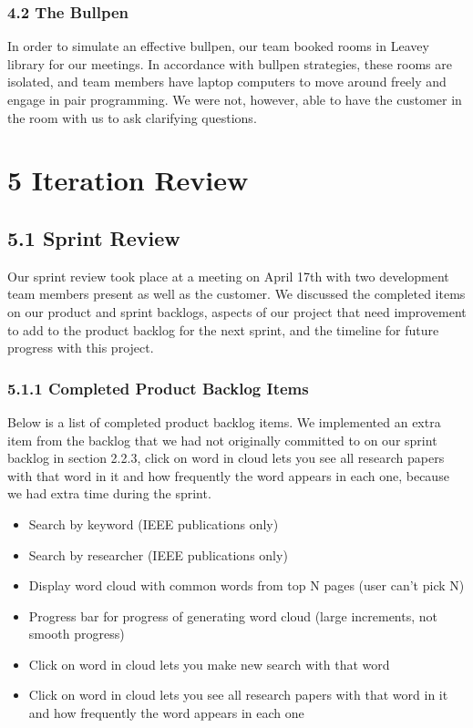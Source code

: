 \documentclass[]{article}
\begin{document}
\subsubsection{4.2 The Bullpen}\label{the-bullpen}

In order to simulate an effective bullpen, our team booked rooms in
Leavey library for our meetings. In accordance with bullpen strategies,
these rooms are isolated, and team members have laptop computers to move
around freely and engage in pair programming. We were not, however, able
to have the customer in the room with us to ask clarifying questions.

\section{5 Iteration Review}\label{iteration-review}

\subsection{5.1 Sprint Review}\label{sprint-review}

Our sprint review took place at a meeting on April 17th with two
development team members present as well as the customer. We discussed
the completed items on our product and sprint backlogs, aspects of our
project that need improvement to add to the product backlog for the next
sprint, and the timeline for future progress with this project.

\subsubsection{5.1.1 Completed Product Backlog
Items}\label{completed-product-backlog-items}

Below is a list of completed product backlog items. We implemented an
extra item from the backlog that we had not originally committed to on
our sprint backlog in section 2.2.3, click on word in cloud lets you see
all research papers with that word in it and how frequently the word
appears in each one, because we had extra time during the sprint.

\begin{itemize}
\itemsep1pt\parskip0pt
\item
  Search by keyword (IEEE publications only)
\item
  Search by researcher (IEEE publications only)
\item
  Display word cloud with common words from top N pages (user can't pick
  N)
\item
  Progress bar for progress of generating word cloud (large increments,
  not smooth progress)
\item
  Click on word in cloud lets you make new search with that word
\item
  Click on word in cloud lets you see all research papers with that word
  in it and how frequently the word appears in each one
\end{itemize}
\end{document}
